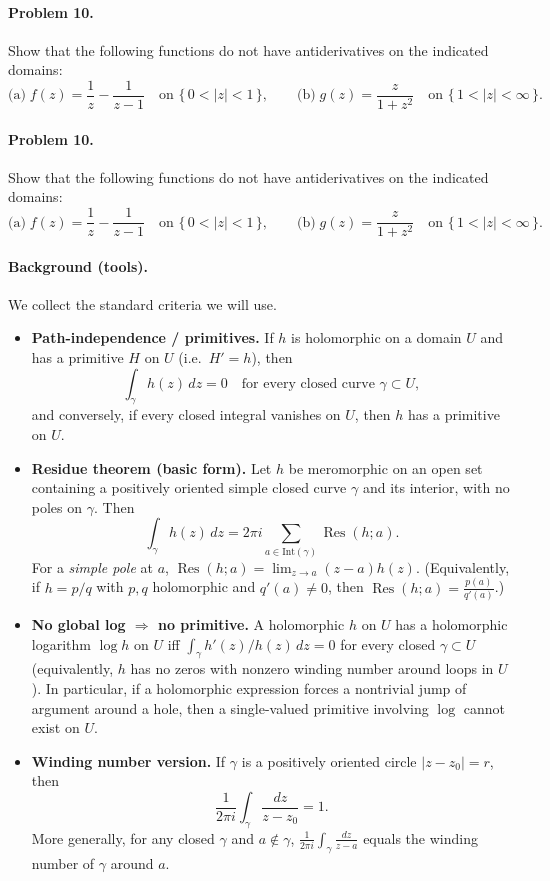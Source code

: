 \documentclass[11pt,a4paper]{article}
\theoremstyle{definition}
\theoremstyle{definition}
\theoremstyle{plain}
\theoremstyle{remark}
\begin{document}
\paragraph{Problem 10.}
Show that the following functions do not have antiderivatives on the indicated domains:
\[
\text{(a)}\; f(z)=\frac{1}{z}-\frac{1}{z-1}\quad\text{on } \{\,0<|z|<1\,\},\qquad
\text{(b)}\; g(z)=\frac{z}{1+z^{2}}\quad\text{on } \{\,1<|z|<\infty\,\}.
\]

\paragraph{Problem 10.}
Show that the following functions do not have antiderivatives on the indicated domains:
\[
\text{(a)}\; f(z)=\frac{1}{z}-\frac{1}{z-1}\quad\text{on } \{\,0<|z|<1\,\},\qquad
\text{(b)}\; g(z)=\frac{z}{1+z^{2}}\quad\text{on } \{\,1<|z|<\infty\,\}.
\]

\paragraph{Background (tools).}
We collect the standard criteria we will use.

\begin{itemize}
	\item \textbf{Path-independence / primitives.} If $h$ is holomorphic on a domain $U$ and has a primitive $H$ on $U$ (i.e.\ $H'=h$), then
	\[
	\int_\gamma h(z)\,dz=0 \quad \text{for every closed curve }\gamma\subset U,
	\]
	and conversely, if every closed integral vanishes on $U$, then $h$ has a primitive on $U$.
	
	\item \textbf{Residue theorem (basic form).} Let $h$ be meromorphic on an open set containing a positively oriented simple closed curve $\gamma$ and its interior, with no poles on $\gamma$. Then
	\[
	\int_\gamma h(z)\,dz = 2\pi i \sum_{a\in \mathrm{Int}(\gamma)} \operatorname{Res}(h;a).
	\]
	For a \emph{simple pole} at $a$, $\displaystyle \operatorname{Res}(h;a)=\lim_{z\to a}(z-a)h(z)$.
	(Equivalently, if $h=p/q$ with $p,q$ holomorphic and $q'(a)\neq 0$, then
	$\displaystyle \operatorname{Res}(h;a)=\frac{p(a)}{q'(a)}$.)
	
	\item \textbf{No global log $\Rightarrow$ no primitive.} A holomorphic $h$ on $U$ has a holomorphic logarithm $\log h$ on $U$ iff $\int_\gamma h'(z)/h(z)\,dz=0$ for every closed $\gamma\subset U$ (equivalently, $h$ has no zeros with nonzero winding number around loops in $U$). In particular, if a holomorphic expression forces a nontrivial jump of argument around a hole, then a single-valued primitive involving $\log$ cannot exist on $U$.
	
	\item \textbf{Winding number version.} If $\gamma$ is a positively oriented circle $|z-z_0|=r$, then
	\[
	\frac{1}{2\pi i}\int_\gamma \frac{dz}{z-z_0}=1.
	\]
	More generally, for any closed $\gamma$ and $a\notin \gamma$, $\displaystyle \frac{1}{2\pi i}\int_\gamma \frac{dz}{z-a}$
	equals the winding number of $\gamma$ around $a$.
\end{itemize}
\end{document}

